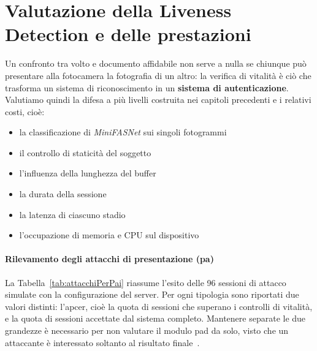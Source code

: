 
\section{Valutazione della Liveness Detection e delle prestazioni}\label{cap:4.3-liveness}
Un confronto tra volto e documento affidabile non serve a nulla se chiunque può presentare alla fotocamera la fotografia di un altro: la verifica di vitalità è ciò che trasforma un sistema di riconoscimento in un \textbf{sistema di autenticazione}.
Valutiamo quindi la difesa a più livelli costruita nei capitoli precedenti e i relativi costi, cioè:
\begin{itemize}
    \item la classificazione di \textit{MiniFASNet} sui singoli fotogrammi
    \item il controllo di staticità del soggetto
    \item l'influenza della lunghezza del buffer
    \item la durata della sessione
    \item la latenza di ciascuno stadio
    \item l'occupazione di memoria e CPU sul dispositivo
\end{itemize}
\paragraph{Rilevamento degli attacchi di presentazione (\gls{pa})}
La Tabella~\ref{tab:attacchiPerPai} riassume l'esito delle 96 sessioni di attacco simulate con la configurazione del server.
Per ogni tipologia sono riportati due valori distinti: l'\gls{apcer}, cioè la quota di sessioni che superano i controlli di vitalità, e la quota di sessioni accettate dal sistema completo.
Mantenere separate le due grandezze è necessario per non valutare il modulo \gls{pad} da solo, visto che un attaccante è interessato soltanto al risultato finale~\cite{groupBiometricLivenessPresentation}.

